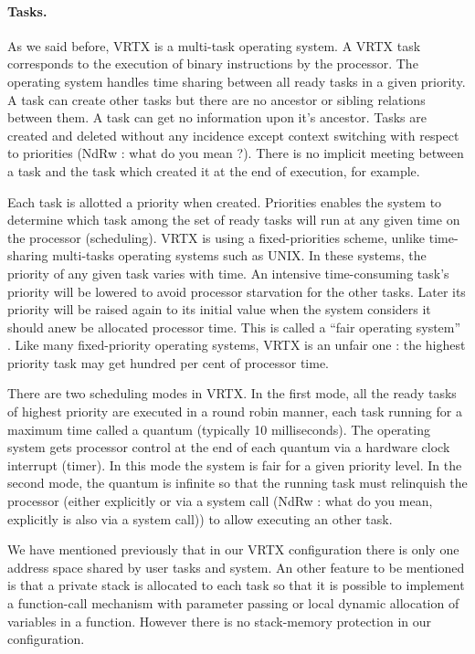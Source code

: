 \documentclass[10pt]{report}
\begin{document}
\paragraph{Tasks.} As we said before, VRTX is a multi-task operating system. A VRTX 
task corresponds to the execution of binary instructions by the 
processor. The operating system handles time sharing between all 
ready tasks in a given priority. A task can create other tasks 
but there are no ancestor or sibling relations between them. A 
task can get no information upon it's ancestor. Tasks are created 
and deleted without any incidence except context switching with 
respect to priorities (NdRw : what do you mean ?). There is no 
implicit meeting between a task and the task which created it at 
the end of execution, for example.

Each task is allotted a priority when created. Priorities enables 
the system to determine which task among the set of ready tasks 
will run at any given time on the processor (scheduling). VRTX is 
using a fixed-priorities scheme, unlike time-sharing multi-tasks 
operating systems such as UNIX. In these systems, the priority of 
any given task varies with time. An intensive time-consuming 
task's priority will be lowered to avoid processor starvation for 
the other tasks. Later its priority will be raised again to its 
initial value when the system considers it should anew be 
allocated processor time. This is called a “fair operating system”
. Like many fixed-priority operating systems, VRTX is an unfair 
one : the highest priority task may get hundred per cent of 
processor time.

There are two scheduling modes in VRTX. In the first mode, all 
the ready tasks of highest priority are executed in a round robin 
manner, each task running for a maximum time called a quantum 
(typically 10 milliseconds). The operating system gets processor 
control at the end of each quantum via a hardware clock interrupt 
(timer). In this mode the system is fair for a given priority 
level. In the second mode, the quantum is infinite so that the 
running task must relinquish the processor (either explicitly or 
via a system call (NdRw : what do you mean, explicitly is also 
via a system call)) to allow executing an other task.

We have mentioned previously that in our VRTX configuration there 
is only one address space shared by user tasks and system. An 
other feature to be mentioned is that a private stack is 
allocated to each task so that it is possible to implement a 
function-call mechanism with parameter passing or local dynamic 
allocation of variables in a function. However there is no 
stack-memory protection in our configuration.
\end{document}
